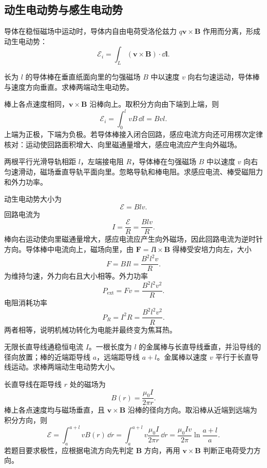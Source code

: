 \subsection{动生电动势与感生电动势}

\begin{definition}[动生电动势]\label{def:motional-emf}
导体在稳恒磁场中运动时，导体内自由电荷受洛伦兹力 $q\bm v\times\bm B$ 作用而分离，形成动生电动势：
\[
  \mathcal E_i=\int_L(\bm v\times\bm B)\cdot\dd\bm l.
\]
\end{definition}


\begin{example}[title={滑动导体棒的动生电动势}]\label{eg:sliding-rod}
长为 $l$ 的导体棒在垂直纸面向里的匀强磁场 $B$ 中以速度 $v$ 向右匀速运动，导体棒与速度方向垂直。求棒两端动生电动势。
\begin{solution}
棒上各点速度相同，$\bm v\times\bm B$ 沿棒向上。取积分方向由下端到上端，则
\[
  \mathcal E_i=\int_0^l vB\,\dd l=Bvl.
\]
上端为正极，下端为负极。若导体棒接入闭合回路，感应电流方向还可用楞次定律核对：运动使回路面积增大、向里磁通量增大，感应电流应产生向外磁场。
\end{solution}
\end{example}

\begin{example}[title={滑动导体棒回路的电流、阻力和功率}]\label{eg:sliding-rod-circuit}
两根平行光滑导轨相距 $l$，左端接电阻 $R$，导体棒在匀强磁场 $B$ 中以速度 $v$ 向右匀速滑动，磁场垂直导轨平面向里。忽略导轨和棒电阻。求感应电流、棒受磁阻力和外力功率。
\begin{solution}
动生电动势大小为
\[
  \mathcal E=Blv.
\]
回路电流为
\[
  I=\frac{\mathcal E}{R}=\frac{Blv}{R}.
\]
棒向右运动使向里磁通量增大，感应电流应产生向外磁场，因此回路电流为逆时针方向。导体棒中电流向上，磁场向里，由 $\bm F=I\bm l\times\bm B$ 得棒受安培力向左，大小
\[
  F=BIl=\frac{B^2l^2v}{R}.
\]
为维持匀速，外力向右且大小相等。外力功率
\[
  P_{\mathrm{ext}}=Fv=\frac{B^2l^2v^2}{R}.
\]
电阻消耗功率
\[
  P_R=I^2R=\frac{B^2l^2v^2}{R}.
\]
两者相等，说明机械功转化为电能并最终变为焦耳热。
\end{solution}
\end{example}

\begin{example}[title={长直导线旁径向金属棒的动生电动势}]\label{eg:rod-near-wire-emf}
无限长直导线通稳恒电流 $I$。一根长度为 $l$ 的金属棒与长直导线垂直，并沿导线的径向放置；棒的近端距导线 $a$，远端距导线 $a+l$。金属棒以速度 $v$ 平行于长直导线运动。求棒两端动生电动势大小。
\begin{solution}
长直导线在距导线 $r$ 处的磁场为
\[
  B(r)=\frac{\mu_0 I}{2\pi r}.
\]
棒上各点速度均与磁场垂直，且 $\bm v\times\bm B$ 沿棒的径向方向。取沿棒从近端到远端为积分方向，则
\[
  \mathcal E=\int_a^{a+l} vB(r)\,\dd r
  =\int_a^{a+l} v\frac{\mu_0 I}{2\pi r}\,\dd r
  =\frac{\mu_0 Iv}{2\pi}\ln\frac{a+l}{a}.
\]
若题目要求极性，应根据电流方向先判定 $\bm B$ 方向，再用 $\bm v\times\bm B$ 判断正电荷受力方向。
\end{solution}
\end{example}

